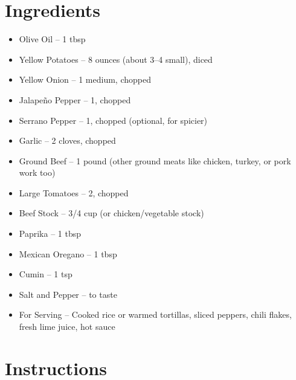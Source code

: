 




\section*{Ingredients}

\begin{itemize}
      \item[\measure] Olive Oil – 1 tbsp
      \item[\cut] Yellow Potatoes – 8 ounces (about 3--4 small), diced
      \item[\cut] Yellow Onion – 1 medium, chopped
      \item[\cut] Jalapeño Pepper – 1, chopped
      \item[\cut] Serrano Pepper – 1, chopped (optional, for spicier)
      \item[\cut] Garlic – 2 cloves, chopped
      \item Ground Beef – 1 pound (other ground meats like chicken, turkey, or pork work too)
      \item[\cut] Large Tomatoes – 2, chopped
      \item[\measure] Beef Stock – 3/4 cup (or chicken/vegetable stock)
      \item[\measure] Paprika – 1 tbsp
      \item[\measure] Mexican Oregano – 1 tbsp
      \item[\measure] Cumin – 1 tsp
      \item Salt and Pepper – to taste
      \item For Serving – Cooked rice or warmed tortillas, sliced peppers, chili flakes, fresh lime juice, hot sauce
\end{itemize}

\newpage
{}
\section*{Instructions}

